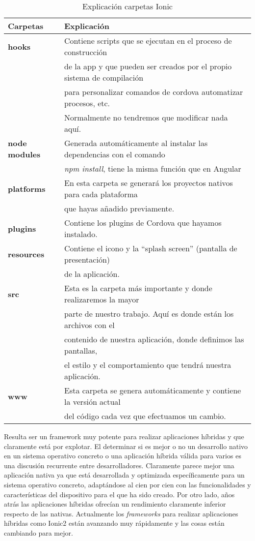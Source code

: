  \begin{table}[H]
\begin{center}
\begin{tabular}{|l|l|}
\hline
Carpetas & Explicación  \\
\hline \hline
\textbf{hooks}  & Contiene scripts que se ejecutan en el proceso de construcción \\
&  de la app   y que pueden ser creados por el propio sistema de compilación \\
 & para personalizar  comandos de cordova automatizar procesos, etc. \\   
 & Normalmente no tendremos que modificar nada aquí.  \\ \hline
\textbf{node modules}  & Generada automáticamente al instalar las dependencias con el comando  \\ 
& \emph{npm install},  tiene la misma función que en Angular  \\ \hline
\textbf{platforms} &  En esta carpeta se generará los proyectos nativos para cada plataforma   \\
&  que hayas añadido previamente.  \\ \hline
\textbf{plugins} &  Contiene los plugins de Cordova que hayamos instalado.   \\ \hline
\textbf{resources} &  Contiene el icono y la “splash screen” (pantalla de presentación)   \\
& de la aplicación.\\  \hline
\textbf{src} &  Esta es la carpeta más importante y donde realizaremos la mayor\\ 
& parte de nuestro trabajo. Aquí es donde están los archivos con el \\
&contenido de nuestra aplicación,  donde definimos las pantallas,   \\ 
   & el estilo y el comportamiento que tendrá nuestra  aplicación.  \\ \hline
  \textbf{www} &   Esta carpeta se genera automáticamente y contiene la versión actual \\
  & del código cada vez que efectuamos un cambio.   \\ \hline
  
\end{tabular}
\caption{Explicación carpetas Ionic}
\end{center}
\end{table}  

Resulta ser un framework muy potente para realizar aplicaciones híbridas y que claramente está por explotar. El determinar si es mejor o no un desarrollo nativo en un sistema operativo concreto o una aplicación híbrida válida para varios es una discusión recurrente entre desarrolladores. Claramente parece mejor una aplicación nativa ya que está desarrollada y optimizada específicamente para un sistema operativo concreto, adaptándose al cien por cien con las funcionalidades y características del dispositivo para el que ha sido creado. Por otro lado, años atrás las aplicaciones híbridas ofrecían un rendimiento claramente inferior respecto de las nativas. Actualmente los \emph{frameworks} para realizar aplicaciones híbridas como Ionic2 están avanzando muy rápidamente y las cosas están cambiando para mejor. 



